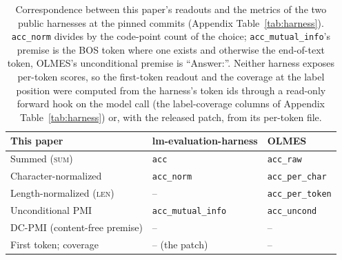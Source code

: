 \begin{table}[t]
\centering\scriptsize
\setlength{\tabcolsep}{3pt}
\begin{tabular}{@{}lll@{}}
\toprule
This paper & lm-evaluation-harness & OLMES \\
\midrule
Summed (\textsc{sum}) & \texttt{acc} & \texttt{acc\_raw} \\
Character-normalized & \texttt{acc\_norm} & \texttt{acc\_per\_char} \\
Length-normalized (\textsc{len}) & -- & \texttt{acc\_per\_token} \\
Unconditional PMI & \texttt{acc\_mutual\_info} & \texttt{acc\_uncond} \\
DC-PMI (content-free premise) & -- & -- \\
First token; coverage & -- (the patch) & -- \\
\bottomrule
\end{tabular}
\caption{Correspondence between this paper's readouts and the metrics of the two public harnesses at the pinned commits (Appendix Table~\ref{tab:harness}). \texttt{acc\_norm} divides by the code-point count of the choice; \texttt{acc\_mutual\_info}'s premise is the BOS token where one exists and otherwise the end-of-text token, OLMES's unconditional premise is ``Answer:''. Neither harness exposes per-token scores, so the first-token readout and the coverage at the label position were computed from the harness's token ids through a read-only forward hook on the model call (the label-coverage columns of Appendix Table~\ref{tab:harness}) or, with the released patch, from its per-token file.}
\label{tab:harness-names}
\end{table}
